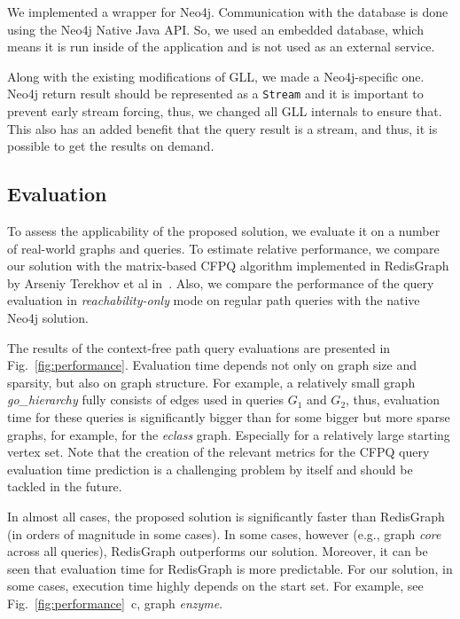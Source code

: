 \documentclass[
11pt,%
tightenlines,%
twoside,%
onecolumn,%
nobibnotes,%
nofootinbib,%
superscriptaddress,%
noshowpacs,%
longbibliography,%
centertags]%
{revtex4-2}
\begin{document}
We implemented a wrapper for Neo4j. Communication with the database is done using the Neo4j Native Java API. So, we used an embedded database, which means it is run inside of the application and is not used as an external service.

Along with the existing modifications of GLL, we made a Neo4j-specific one. Neo4j return result should be represented as a \texttt{Stream} and it is important to prevent early stream forcing, thus, we changed all GLL internals to ensure that. This also has an added benefit that the query result is a stream, and thus, it is possible to get the results on demand. 

\subsection{Evaluation}

To assess the applicability of the proposed solution, we evaluate it on a number of real-world graphs and queries. To estimate relative performance, we compare our solution with the matrix-based CFPQ algorithm implemented in RedisGraph by Arseniy Terekhov et al in~\cite{DBLP:conf/edbt/TerekhovPAZG21}. Also, we compare the performance of the query evaluation in \textit{reachability-only} mode on regular path queries with the native Neo4j solution.


The results of the context-free path query evaluations are presented in Fig.~\ref{fig:performance}. 
Evaluation time depends not only on graph size and sparsity, but also on graph structure. 
For example, a relatively small graph \textit{go\_hierarchy} fully consists of edges used in queries $G_1$ and $G_2$, thus, evaluation time for these queries is significantly bigger than for some bigger but more sparse graphs, for example, for the \textit{eclass} graph. Especially for a relatively large starting vertex set. Note that the creation of the relevant metrics for the CFPQ query evaluation time prediction is a challenging problem by itself and should be tackled in the future.

In almost all cases, the proposed solution is significantly faster than RedisGraph (in orders of magnitude in some cases).
In some cases, however (e.g., graph \textit{core} across all queries), RedisGraph outperforms our solution. Moreover, it can be seen that evaluation time for RedisGraph is more predictable. For our solution, in some cases, execution time highly depends on the start set. For example, see Fig.~\ref{fig:performance}~c, graph \textit{enzyme}.    
\end{document}
